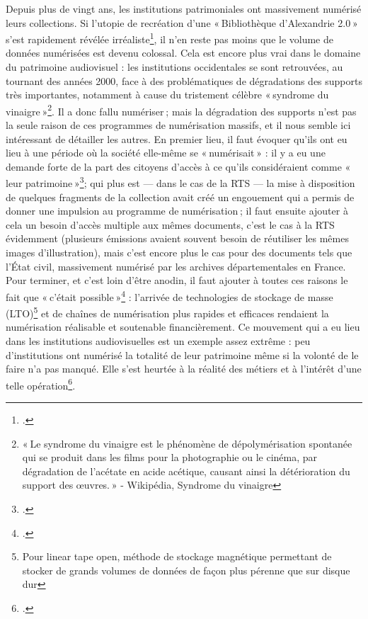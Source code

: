 Depuis plus de vingt ans, les institutions patrimoniales ont massivement numérisé leurs collections. Si l’utopie de recréation d’une « Bibliothèque d’Alexandrie 2.0 » s’est rapidement révélée irréaliste\footcite[p. 20]{bermes2024}, il n’en reste pas moins que le volume de données numérisées est devenu colossal. Cela est encore plus vrai dans le domaine du patrimoine audiovisuel : les institutions occidentales se sont retrouvées, au tournant des années 2000, face à des problématiques de dégradations des supports très importantes, notamment à cause du tristement célèbre « syndrome du vinaigre »\footnote{« Le syndrome du vinaigre est le phénomène de dépolymérisation spontanée qui se produit dans les films pour la photographie ou le cinéma, par dégradation de l’acétate en acide acétique, causant ainsi la détérioration du support des œuvres. » - Wikipédia, Syndrome du vinaigre}. Il a donc fallu numériser ; mais la dégradation des supports n’est pas la seule raison de ces programmes de numérisation massifs, et il nous semble ici intéressant de détailler les autres. En premier lieu, il faut évoquer qu'ils ont eu lieu à une période où la société elle-même se « numérisait » : il y a eu une demande forte de la part des citoyens d’accès à ce qu’ils considéraient comme « leur patrimoine »\footcite{rezzonico2023}; qui plus est — dans le cas de la RTS — la mise à disposition de quelques fragments de la collection avait créé un engouement qui a permis de donner une impulsion au programme de numérisation ; il faut ensuite ajouter à cela un besoin d’accès multiple aux mêmes documents, c’est le cas à la RTS évidemment (plusieurs émissions avaient souvent besoin de réutiliser les mêmes images d’illustration), mais c’est encore plus le cas pour des documents tels que l’État civil, massivement numérisé par les archives départementales en France. Pour terminer, et c’est loin d’être anodin, il faut ajouter à toutes ces raisons le fait que « c’était possible »\footcite{barcella2024a} : l’arrivée de technologies de stockage de masse (LTO)\footnote{Pour linear tape open, méthode de stockage magnétique permettant de stocker de grands volumes de données de façon plus pérenne que sur disque dur} et de chaînes de numérisation plus rapides et efficaces rendaient la numérisation réalisable et soutenable financièrement. Ce mouvement qui a eu lieu dans les institutions audiovisuelles est un exemple assez extrême : peu d’institutions ont numérisé la totalité de leur patrimoine même si la volonté de le faire n’a pas manqué. Elle s’est heurtée à la réalité des métiers et à l’intérêt d’une telle opération\footcite[p. 21]{bermes2024}.

